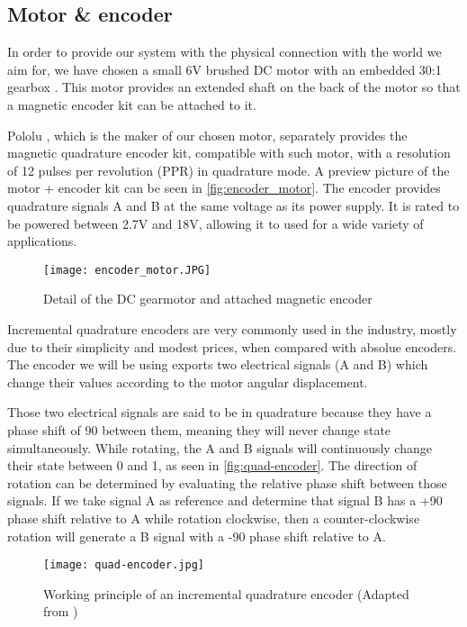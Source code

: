 \subsection{Motor \& encoder}
In order to provide our system with the physical connection with the world we aim for, we have chosen a small 6V brushed DC motor with an embedded 30:1 gearbox \cite{product:pololu-micrometal-gearmotor}.
This motor provides an extended shaft on the back of the motor so that a magnetic encoder kit can be attached to it.

Pololu \cite{brand:pololu}, which is the maker of our chosen motor, separately provides the magnetic quadrature encoder kit, compatible with such motor, with a resolution of 12 pulses per revolution (PPR) in quadrature mode.
A preview picture of the motor + encoder kit can be seen in \autoref{fig:encoder_motor}.
The encoder provides quadrature signals A and B at the same voltage as its power supply.
It is rated to be powered between 2.7V and 18V, allowing it to used for a wide variety of applications.

\begin{figure}[htp]
	\centering
	\texttt{[image: encoder\_motor.JPG]}
	\caption{Detail of the DC gearmotor and attached magnetic encoder}
	\label{fig:encoder_motor}
\end{figure}

Incremental quadrature encoders are very commonly used in the industry, mostly due to their simplicity and modest prices, when compared with absolue encoders.
The encoder we will be using exports two electrical signals (A and B) which change their values according to the motor angular displacement.

Those two electrical signals are said to be in quadrature because they have a phase shift of 90\textdegree{} between them, meaning they will never change state simultaneously.
While rotating, the A and B signals will continuously change their state between 0 and 1, as seen in \autoref{fig:quad-encoder}.
The direction of rotation can be determined by evaluating the relative phase shift between those signals.
If we take signal A as reference and determine that signal B has a +90\textdegree{} phase shift relative to A while rotation clockwise, then a counter-clockwise rotation will generate a B signal with a -90\textdegree{} phase shift relative to A.

\begin{figure}[htp]
	\centering
	\texttt{[image: quad-encoder.jpg]}
	\caption{Working principle of an incremental quadrature encoder (Adapted from \cite{technology:quad-encoder})}
	\label{fig:quad-encoder}
\end{figure}

